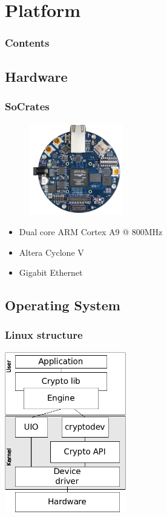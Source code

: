 \documentclass[xcolor={x11names, rgb, usenames, dvipsnames}]{beamer}
\begin{document}
\section{Platform}
\begin{frame}
\frametitle{Contents}
\tableofcontents[%
	currentsection,
	sectionstyle=show/shaded,%
	subsectionstyle=show/show/hide,%
	]
\end{frame}


\subsection{Hardware}
\begin{frame}
\frametitle{SoCrates}
	\begin{figure}
	\includegraphics[height=4cm]{../socrates-photo.png}
	\end{figure}
	
	\begin{itemize}
		\item Dual core ARM Cortex A9 @ 800MHz
		\item Altera Cyclone V
		\item Gigabit Ethernet
	\end{itemize}
\end{frame}


\subsection{Operating System}
\begin{frame}
\frametitle{Linux structure}
	\begin{center}
	\includegraphics[height=7cm]{os-path-generic.png}
	\end{center}
\end{frame}
\end{document}
